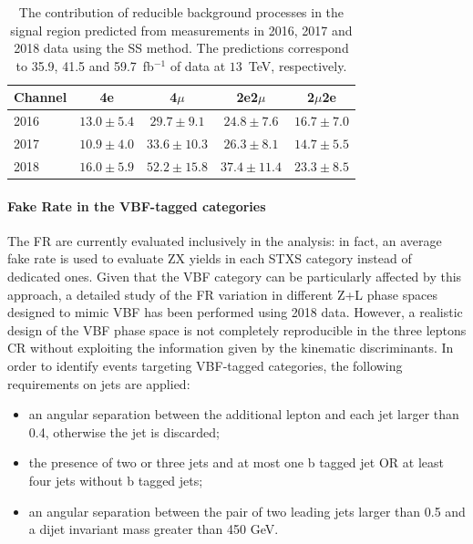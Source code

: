 \begin{table}[!htb]
\begin{center}
     \begin{tabular}{| l | c | c | c | c |} \hline
Channel & 4e               & 4$\mu$          & 2e2$\mu$        & 2$\mu$2e        \\ \hline \hline
2016    & $ 13.0 \pm 5.4 $ & $29.7 \pm 9.1$  & $24.8 \pm 7.6$  & $16.7 \pm 7.0$  \\
2017    & $ 10.9 \pm 4.0 $ & $33.6 \pm 10.3$ & $26.3 \pm 8.1$  & $14.7 \pm 5.5$  \\
2018    & $ 16.0 \pm 5.9 $ & $52.2 \pm 15.8$ & $37.4 \pm 11.4$ & $23.3 \pm 8.5$  \\ \hline
        \end{tabular}
\end{center}
    \caption{ The contribution of reducible background
    processes in the signal region predicted from measurements in 2016, 2017 and 2018 data
    using the SS method. The predictions correspond to 35.9, 41.5 and 59.7~fb$^{-1}$ of data at $13$~TeV, respectively.}
     \label{tab:SSyields}
\end{table}

\paragraph{Fake Rate in the VBF-tagged categories}
The FR are currently evaluated inclusively in the analysis: in fact, an average fake rate is used to evaluate ZX yields in each STXS category instead of dedicated ones.
Given that the VBF category can be particularly affected by this approach, a detailed study of the FR variation in different Z+L phase spaces designed to mimic VBF has been performed using 2018 data. 
However, a realistic design of the VBF phase space is not completely reproducible in the three leptons CR without exploiting the information given by the kinematic discriminants.
In order to identify events targeting VBF-tagged categories, the following requirements on jets are applied:
\begin{itemize} 
\item an angular separation between the additional lepton and each jet larger than 0.4, otherwise the jet is discarded;       
\item the presence of two or three jets and at most one b tagged jet OR at least four jets without b tagged jets;
\item an angular separation between the pair of two leading jets larger than 0.5 and a dijet invariant mass greater than 450 GeV. 
\end{itemize}

